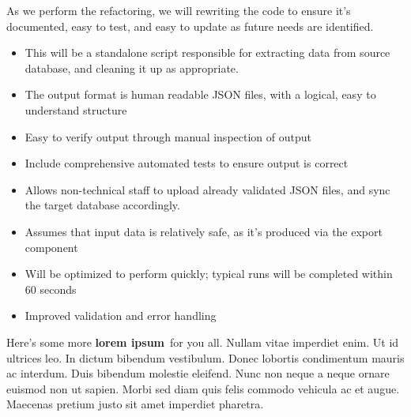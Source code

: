 As we perform the refactoring, we will rewriting the code to ensure it's documented, easy to test, and easy to update as future needs are identified.


\begin{itemize}
\itemsep1pt\parskip0pt
\item
  This will be a standalone script responsible for extracting data from source database, and cleaning it up as appropriate.
\item
  The output format is human readable JSON files, with a logical, easy to understand structure
\item
  Easy to verify output through manual inspection of output
\item
  Include comprehensive automated tests to ensure output is correct
\end{itemize}


\begin{itemize}
\itemsep1pt\parskip0pt
\item
  Allows non-technical staff to upload already validated JSON files, and sync the target database accordingly.
\item
  Assumes that input data is relatively safe, as it's produced via the export component
\item
  Will be optimized to perform quickly; typical runs will be completed within 60 seconds
\item
  Improved validation and error handling
\end{itemize}


Here's some more \textbf{lorem ipsum}~for you all. Nullam vitae imperdiet enim. Ut id ultrices leo. In dictum bibendum vestibulum. Donec lobortis condimentum mauris ac interdum. Duis bibendum molestie eleifend. Nunc non neque a neque ornare euismod non ut sapien. Morbi sed diam quis felis commodo vehicula ac et augue. Maecenas pretium justo sit amet imperdiet pharetra.


